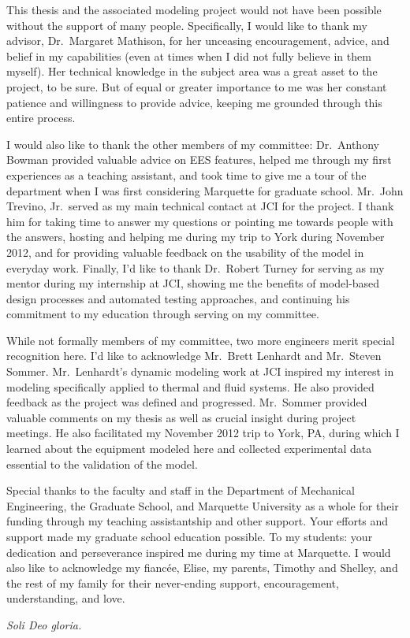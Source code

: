 \begin{acknowledgments}
  This thesis and the associated modeling project 
  would not have been possible without the support of many people. 
  Specifically, I would like to thank my advisor, Dr.~Margaret Mathison,
  for her unceasing encouragement, advice, and belief in my capabilities 
  (even at times when I did not fully believe in them myself). 
  Her technical knowledge in the subject area was a 
  great asset to the project, to be sure.
  But of equal or greater importance to me was 
  her constant patience and willingness to provide advice, 
  keeping me grounded through this entire process.
  
  I would also like to thank the other members of my committee:
  Dr.~Anthony Bowman provided valuable advice on EES features,
  helped me through my first experiences as a teaching assistant, 
  and took time to give me a tour of the department when I was 
  first considering Marquette for graduate school.
  Mr.~John Trevino, Jr.~served as my main technical contact at JCI
  for the project. I thank him for taking time to answer my questions
  or pointing me towards people with the answers, hosting and helping
  me during my trip to York during November 2012, and for providing
  valuable feedback on the usability of the model in everyday work.
  Finally, I'd like to thank Dr.~Robert Turney for serving as my mentor
  during my internship at JCI, showing me the benefits of model-based
  design processes and automated testing approaches, and continuing
  his commitment to my education through serving on my committee.
  
  While not formally members of my committee, two more 
  engineers merit special recognition here. 
  I'd like to acknowledge Mr.~Brett Lenhardt and Mr.~Steven Sommer.
  Mr.~Lenhardt's dynamic modeling work at JCI inspired my interest
  in modeling specifically applied to thermal and fluid systems.
  He also provided feedback as the project was defined and progressed.
  Mr.~Sommer provided valuable comments on my thesis as well as crucial
  insight during project meetings. He also facilitated my November 2012 trip
  to York, PA, during which I learned about the equipment modeled here
  and collected experimental data essential to the validation of the model.

  Special thanks to the faculty and staff in the Department of 
  Mechanical Engineering, the Graduate School, and Marquette University 
  as a whole for their funding through my teaching assistantship and other support.
  Your efforts and support made my graduate school education possible.
  To my students: your dedication and perseverance 
  inspired me during my time at Marquette. 
  I would also like to acknowledge my fianc\'ee, Elise, 
  my parents, Timothy and Shelley, and the rest of my family for their 
  never-ending support, encouragement, understanding, and love.

  \vfill \centering
    \emph{Soli Deo gloria.}
  \vfill
\end{acknowledgments}
